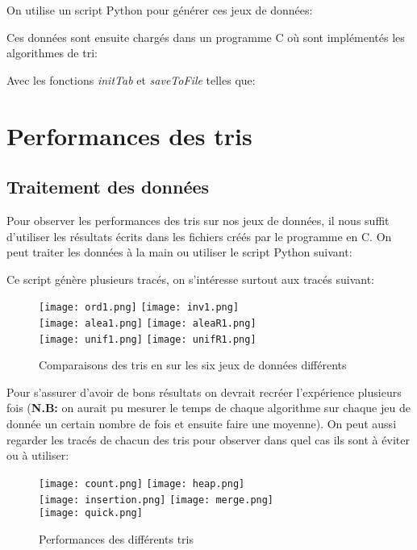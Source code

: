 \documentclass[12pt]{article}
\begin{document}
			On utilise un script Python pour générer ces jeux de données:
				 \newpage
				
			Ces données sont ensuite chargés dans un programme C où sont implémentés les algorithmes de tri:
			
			
			Avec les fonctions \textit{initTab} et \textit{saveToFile} telles que:
			
			
	\section{Performances des tris}
		\subsection{Traitement des données}
			Pour observer les performances des tris sur nos jeux de données, il nous suffit d'utiliser les résultats écrits dans les fichiers créés par le programme en C. On peut traiter les données à la main ou utiliser le script Python suivant: 
			
			
			Ce script génère plusieurs tracés, on s'intéresse surtout aux tracés suivant:
			\begin{figure}[hbt!]
				\centering
				\texttt{[image: ord1.png]}
				\texttt{[image: inv1.png]} \\
				\texttt{[image: alea1.png]}
				\texttt{[image: aleaR1.png]} \\
				\texttt{[image: unif1.png]}
				\texttt{[image: unifR1.png]} \\
				\caption{Comparaisons des tris en sur les six jeux de données différents}
			\end{figure}
			\justify
			
			Pour s'assurer d'avoir de bons résultats on devrait recréer l'expérience plusieurs fois (\textbf{N.B:} on aurait pu mesurer le temps de chaque algorithme sur chaque jeu de donnée un certain nombre de fois et ensuite faire une moyenne). On peut aussi regarder les tracés de chacun des tris pour observer dans quel cas ils sont à éviter ou à utiliser:
			\begin{figure}[hbt!]
				\centering
				\texttt{[image: count.png]}
				\texttt{[image: heap.png]} \\
				\texttt{[image: insertion.png]}
				\texttt{[image: merge.png]} \\
				\texttt{[image: quick.png]}
				\caption{Performances des différents tris}
			\end{figure}
			\justify
			
\end{document}
